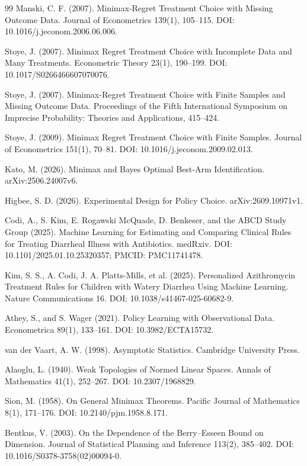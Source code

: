 \documentclass{article}
\begin{document}
\begin{thebibliography}{99}
   Manski, C. F. (2007). Minimax-Regret Treatment Choice with Missing Outcome Data. Journal of Econometrics 139(1), 105--115. DOI: 10.1016/j.jeconom.2006.06.006.

   Stoye, J. (2007). Minimax Regret Treatment Choice with Incomplete Data and Many Treatments. Econometric Theory 23(1), 190--199. DOI: 10.1017/S0266466607070076.

   Stoye, J. (2007). Minimax-Regret Treatment Choice with Finite Samples and Missing Outcome Data. Proceedings of the Fifth International Symposium on Imprecise Probability: Theories and Applications, 415--424.

   Stoye, J. (2009). Minimax Regret Treatment Choice with Finite Samples. Journal of Econometrics 151(1), 70--81. DOI: 10.1016/j.jeconom.2009.02.013.

   Kato, M. (2026). Minimax and Bayes Optimal Best-Arm Identification. arXiv:2506.24007v6.

   Higbee, S. D. (2026). Experimental Design for Policy Choice. arXiv:2609.10971v1.

   Codi, A., S. Kim, E. Rogawski McQuade, D. Benkeser, and the ABCD Study Group (2025). Machine Learning for Estimating and Comparing Clinical Rules for Treating Diarrheal Illness with Antibiotics. medRxiv. DOI: 10.1101/2025.01.10.25320357; PMCID: PMC11741478.

   Kim, S. S., A. Codi, J. A. Platts-Mills, et al. (2025). Personalized Azithromycin Treatment Rules for Children with Watery Diarrhea Using Machine Learning. Nature Communications 16. DOI: 10.1038/s41467-025-60682-9.

   Athey, S., and S. Wager (2021). Policy Learning with Observational Data. Econometrica 89(1), 133--161. DOI: 10.3982/ECTA15732.

   van der Vaart, A. W. (1998). Asymptotic Statistics. Cambridge University Press.

   Alaoglu, L. (1940). Weak Topologies of Normed Linear Spaces. Annals of Mathematics 41(1), 252--267. DOI: 10.2307/1968829.

   Sion, M. (1958). On General Minimax Theorems. Pacific Journal of Mathematics 8(1), 171--176. DOI: 10.2140/pjm.1958.8.171.

   Bentkus, V. (2003). On the Dependence of the Berry--Esseen Bound on Dimension. Journal of Statistical Planning and Inference 113(2), 385--402. DOI: 10.1016/S0378-3758(02)00094-0.

\end{thebibliography}
\end{document}
